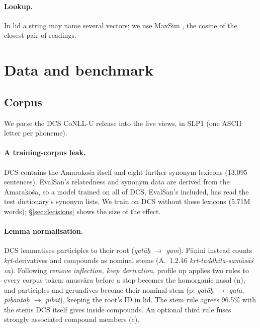 \documentclass[11pt]{article}
\newcommand{\vk}[1]{\textsf{#1}}
\begin{document}
\paragraph{Lookup.} In \vk{lid} a string may name several vectors; we use
MaxSim \citep{reisinger2010multi}, the cosine of the closest pair of
readings.

\section{Data and benchmark}\label{sec:data}
\subsection{Corpus}\label{sec:corpus}
We parse the DCS CoNLL-U release \citep{hellwig2010dcs} into the five
views, in SLP1 (one ASCII letter per phoneme).

\paragraph{A training-corpus leak.} DCS contains the Amarakośa itself and
eight further synonym lexicons (13,095 sentences). EvalSan's relatedness and
synonym data are derived from the Amarakośa, so a model trained on all of
DCS, EvalSan's included, has read the test dictionary's synonym lists. We
train on DCS without these lexicons (5.71M words); \S\ref{sec:decisions}
shows the size of the effect.

\paragraph{Lemma normalisation.} DCS lemmatises participles to their root
(\emph{gatāḥ} $\to$ \emph{gam}). Pāṇini instead counts \emph{kṛt}-derivatives
and compounds as nominal stems (A.~1.2.46 \emph{kṛt-taddhita-samāsāś ca}).
Following \emph{remove inflection, keep derivation}, profile \vk{np}
applies two rules to every corpus token: anusvāra before a stop becomes the
homorganic nasal (\vk{n}), and participles and gerundives become their
nominal stem (\vk{p}: \emph{gatāḥ} $\to$ \emph{gata}, \emph{pibantaḥ} $\to$
\emph{pibat}), keeping the root's ID in \vk{lid}. The stem rule agrees
96.5\% with the stems DCS itself gives inside compounds. An optional third
rule fuses strongly associated compound members (\vk{c}).
\end{document}
